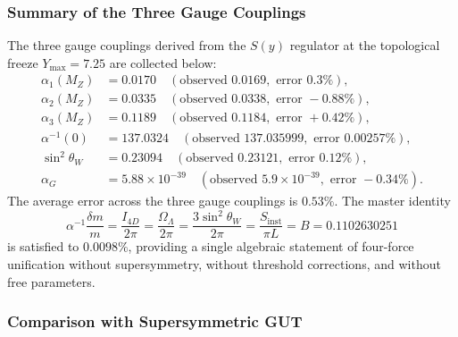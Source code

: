 \documentclass[a4paper,1pt,oneside,openany]{book}
\begin{document}
\subsubsection{Summary of the Three Gauge Couplings}

The three gauge couplings derived from the $S(y)$ regulator at the topological freeze $Y_{\max} = 7.25$ are collected below:
\begin{equation}
\boxed{
\begin{aligned}
\alpha_1(M_Z) &= 0.0170 \quad (\text{observed } 0.0169, \text{ error } 0.3\%), \\
\alpha_2(M_Z) &= 0.0335 \quad (\text{observed } 0.0338, \text{ error } -0.88\%), \\
\alpha_3(M_Z) &= 0.1189 \quad (\text{observed } 0.1184, \text{ error } +0.42\%), \\
\alpha^{-1}(0) &= 137.0324 \quad (\text{observed } 137.035999, \text{ error } 0.00257\%), \\
\sin^2\theta_W &= 0.23094 \quad (\text{observed } 0.23121, \text{ error } 0.12\%), \\
\alpha_G &= 5.88 \times 10^{-39} \quad (\text{observed } 5.9 \times 10^{-39}, \text{ error } -0.34\%).
\end{aligned}}
\label{eq:summary-gut}
\end{equation}
The average error across the three gauge couplings is $0.53\%$. The master identity
\begin{equation}
\alpha^{-1}\frac{\delta m}{m} = \frac{I_{4D}}{2\pi} = \frac{\Omega_\Lambda}{2\pi} = \frac{3\sin^2\theta_W}{2\pi} = \frac{S_{\mathrm{inst}}}{\pi L} = B = 0.1102630251
\label{eq:master-restated}
\end{equation}
is satisfied to $0.0098\%$, providing a single algebraic statement of four-force unification without supersymmetry, without threshold corrections, and without free parameters.

\subsubsection{Comparison with Supersymmetric GUT}
\end{document}
